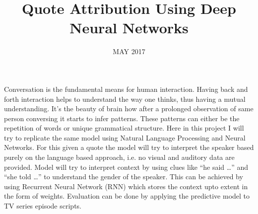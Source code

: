 \documentclass[BTech]{srmuthesis}
\begin{document}

\title{Quote Attribution Using Deep Neural Networks} %

\firstauthorregno{[Reg No: RA1411003010485]}
\secondauthorregno{[Reg No: RA1411003010458]}
\thirdauthor{} %
\thirdauthorregno{}
\fourthauthor{}
\fourthauthorregno{}
\fifthauthor{}
\fifthauthorregno{}
\date{MAY 2017} %

\maketitle
\certificate



\begin{singlespace}
\tableofcontents
\thispagestyle{empty}



\end{singlespace}


\abstract
\begin{doublespacing}
{Conversation is the fundamental means for human interaction. Having back and forth interaction helps to understand the way one thinks, thus having a mutual understanding. It’s the beauty of brain how after a prolonged observation of same person conversing it starts to infer patterns. These patterns can either be the repetition of words or unique grammatical structure.
Here in this project I will try to replicate the same model using Natural
Language Processing and Neural Networks. For this given a quote the model will try to interpret the speaker based purely on the language based approach, i.e. no visual and auditory data are provided. Model will try to interpret context by using clues like “he said …” and “she told …” to understand the gender of the speaker. This can be achieved by using Recurrent Neural Network (RNN) which stores the context upto extent in the form of weights. Evaluation can be done by applying the predictive model to TV series episode scripts.}
\end{doublespacing}
\end{document}
